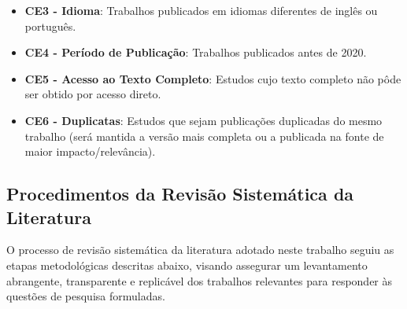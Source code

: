 \begin{itemize}
    \item \textbf{CE3 - Idioma}: Trabalhos publicados em idiomas diferentes de inglês ou português.

    \item \textbf{CE4 - Período de Publicação}: Trabalhos publicados antes de 2020.

    \item \textbf{CE5 - Acesso ao Texto Completo}: Estudos cujo texto completo não pôde ser obtido por acesso direto.

    \item \textbf{CE6 - Duplicatas}: Estudos que sejam publicações duplicadas do mesmo trabalho (será mantida a versão mais completa ou a publicada na fonte de maior impacto/relevância).
\end{itemize}

\subsection{Procedimentos da Revisão Sistemática da Literatura}

O processo de revisão sistemática da literatura adotado neste trabalho seguiu as etapas metodológicas descritas abaixo, visando assegurar um levantamento abrangente, transparente e replicável dos trabalhos relevantes para responder às questões de pesquisa formuladas.

